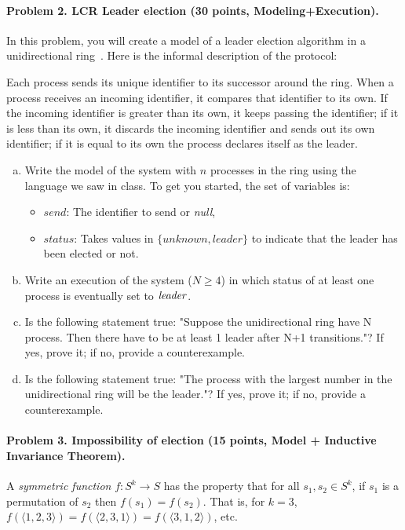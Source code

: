 \documentclass[11pt]{article}
\begin{document}
\paragraph{Problem 2. LCR Leader election (30 points, Modeling+Execution).}
In this problem, you will create a model of a leader election algorithm in a unidirectional ring~\cite{lynch1996a}. Here is the informal description of the protocol:

Each process sends its unique identifier to its successor around the ring. When a process receives an incoming identifier, it compares that identifier to its own. If the incoming identifier is greater than its own, it keeps passing the identifier; if it is less than its own, it discards the incoming identifier and sends out its own identifier; if it is equal to its own the process declares itself as the leader. 

\begin{enumerate}[(a)]
\item Write the model of the system with $n$ processes in the ring using the language we saw in class. To get you started, the set of variables is: 
\begin{itemize}
\item $\mathit{send}$: The identifier to send or {\em null\/},
\item $\mathit{status}$: Takes values in $\{ \mathit{unknown},\mathit{leader}\}$ to indicate that the leader has been elected or not. 
\end{itemize}

\item Write an execution of the system ($N\geq 4$) in which status of at least one process is eventually set to $\mathit{leader\/}$. 

\item Is the following statement true: "Suppose the unidirectional ring have N process. Then there have to be at least 1 leader after N+1 transitions."?  If yes, prove it; if no, provide a counterexample.

\item Is the following statement true: "The process with the largest number in the unidirectional ring will be the leader."?  If yes, prove it; if no, provide a counterexample.
\end{enumerate}

\paragraph{Problem 3. Impossibility of election (15 points, Model + Inductive Invariance Theorem).}
A {\em symmetric function\/} $f:S^k \rightarrow S$ has the property that for all $s_1,s_2\in S^k$, if $s_1$ is a permutation of $s_2$ then $f(s_1) = f(s_2)$. That is, for $k=3$, $f(\langle 1,2,3 \rangle) = f(\langle 2,3,1\rangle) = f(\langle 3,1,2\rangle)$, etc.
\end{document}
